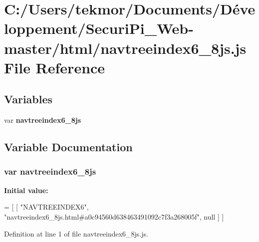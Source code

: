 \section{C\+:/\+Users/tekmor/\+Documents/\+Développement/\+Securi\+Pi\+\_\+\+Web-\/master/html/navtreeindex6\+\_\+8js.js File Reference}
\label{navtreeindex6__8js_8js}
\subsection*{Variables}
\begin{DoxyCompactItemize}
\item 
var {\bf navtreeindex6\+\_\+8js}
\end{DoxyCompactItemize}


\subsection{Variable Documentation}
\subsubsection[{navtreeindex6\+\_\+8js}]{\setlength{\rightskip}{0pt plus 5cm}var navtreeindex6\+\_\+8js}\label{navtreeindex6__8js_8js_a0ee6c9637f8108e82b8a35c0cf9fc101}
{\bfseries Initial value\+:}
\begin{DoxyCode}
=
[
    [ \textcolor{stringliteral}{"NAVTREEINDEX6"}, \textcolor{stringliteral}{"navtreeindex6\_8js.html#a0c94560d638463491092c7f3a268005f"}, null ]
]
\end{DoxyCode}


Definition at line 1 of file navtreeindex6\+\_\+8js.\+js.

